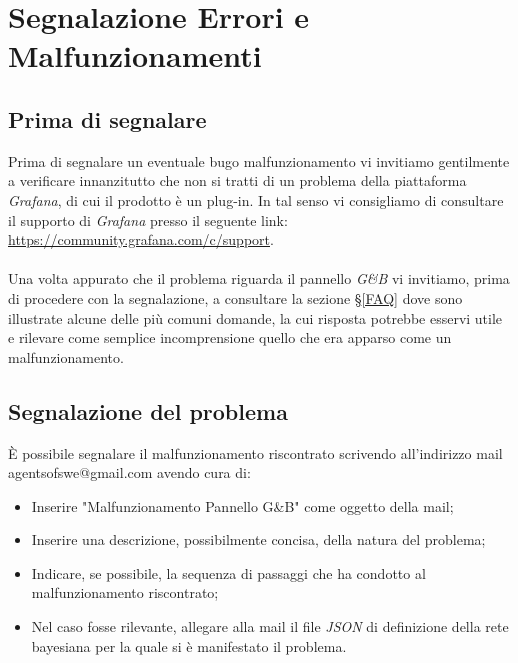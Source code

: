 \section{Segnalazione Errori e Malfunzionamenti}\label{Segnalazione}

\subsection{Prima di segnalare}\label{BeforeReport}
Prima di segnalare un eventuale bug\glossario o malfunzionamento vi invitiamo gentilmente a verificare innanzitutto che non si tratti di un problema della piattaforma \textit{Grafana}, di cui il prodotto è un plug-in. In tal senso vi consigliamo di consultare il supporto di \textit{Grafana} presso il seguente link: \url{https://community.grafana.com/c/support}.\\
~\\
Una volta appurato che il problema riguarda il pannello \textit{G\&B} vi invitiamo, prima di procedere con la segnalazione, a consultare la sezione §\ref{FAQ} dove sono illustrate alcune delle più comuni domande, la cui risposta potrebbe esservi utile e rilevare come semplice incomprensione quello che era apparso come un malfunzionamento.

\subsection{Segnalazione del problema}\label{Report}
È possibile segnalare il malfunzionamento riscontrato scrivendo all'indirizzo mail agentsofswe@gmail.com avendo cura di:
\begin{itemize}
	\item Inserire "Malfunzionamento Pannello G\&B" come oggetto della mail;
	\item Inserire una descrizione, possibilmente concisa, della natura del problema;
	\item Indicare, se possibile, la sequenza di passaggi che ha condotto al malfunzionamento riscontrato;
	\item Nel caso fosse rilevante, allegare alla mail il file \textit{JSON} di definizione della rete bayesiana per la quale si è manifestato il problema.
\end{itemize}
